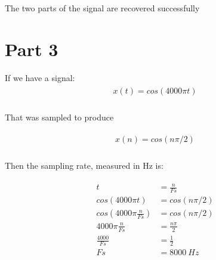 \documentclass[paper=letterpaper, fontsize=11pt]{scrartcl} %
\numberwithin{equation}{section} %
\numberwithin{figure}{section} %
\numberwithin{table}{section} %
\begin{document}
	The two parts of the signal are recovered successfully

\section{Part 3}

If we have a signal:
	\begin{align}
		\begin{split}
			x(t) = cos(4000 \pi t) \\
		\end{split}
	\end{align}

	That was sampled to produce 

	\begin{align}
		\begin{split}
			x(n) = cos(n\pi / 2) \\
		\end{split}
	\end{align}

	Then the sampling rate, measured in Hz is:

	\begin{align}
		\begin{split}
			t &= \frac{n}{Fs} \\
			cos(4000 \pi t) &= cos(n \pi /2) \\
			cos(4000 \pi \frac{n}{Fs}) &= cos(n \pi /2) \\
			4000 \pi \frac{n}{Fs} &= \frac{n \pi}{2} \\
			\frac{4000}{Fs} &= \frac{1}{2} \\
			Fs &= 8000 \: Hz \\
		\end{split}
	\end{align}
\end{document}
